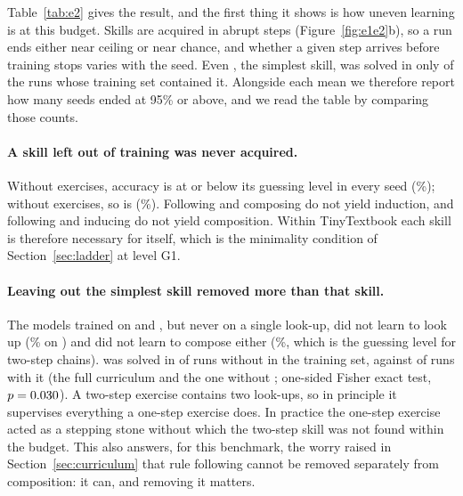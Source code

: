 Table~\ref{tab:e2} gives the result, and the first thing it shows is how uneven learning is at this budget.
Skills are acquired in abrupt steps (Figure~\ref{fig:e1e2}b), so a run ends either near ceiling or near chance, and whether a given step arrives before training stops varies with the seed.
Even , the simplest skill, was solved in only \ETwoPoolFollowTrainedSolved{} of the \ETwoPoolFollowTrainedRuns{} runs whose training set contained it.
Alongside each mean we therefore report how many seeds ended at 95\% or above, and we read the table by comparing those counts.

\paragraph{A skill left out of training was never acquired.}
Without  exercises,  accuracy is at or below its guessing level in every seed (\ETwoNoInduceInduceList\%); without  exercises, so is  (\ETwoNoComposeComposeTwoList\%).
Following and composing do not yield induction, and following and inducing do not yield composition.
Within TinyTextbook each skill is therefore necessary for itself, which is the minimality condition of Section~\ref{sec:ladder} at level G1.

\paragraph{Leaving out the simplest skill removed more than that skill.}
The models trained on  and , but never on a single look-up, did not learn to look up (\ETwoNoFollowFollowList\% on ) and did not learn to compose either (\ETwoNoFollowComposeTwoList\%, which is the guessing level for two-step chains).
 was solved in \ETwoPoolComposeWithoutFollowSolved{} of \ETwoPoolComposeWithoutFollowRuns{} runs without  in the training set, against \ETwoPoolComposeWithFollowSolved{} of \ETwoPoolComposeWithFollowRuns{} runs with it (the full curriculum and the one without ; one-sided Fisher exact test, $p = 0.030$).
A two-step exercise contains two look-ups, so in principle it supervises everything a one-step exercise does.
In practice the one-step exercise acted as a stepping stone without which the two-step skill was not found within the budget.
This also answers, for this benchmark, the worry raised in Section~\ref{sec:curriculum} that rule following cannot be removed separately from composition: it can, and removing it matters.

